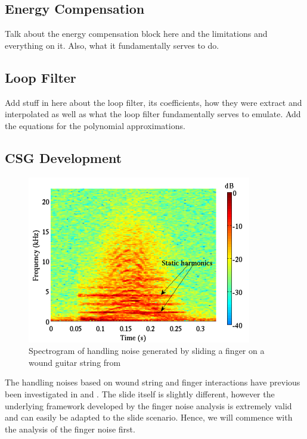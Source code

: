 \documentclass[main.tex]{subfiles}
\begin{document}
\subsection{Energy Compensation}

Talk about the energy compensation block here and the limitations and everything on it. Also, what it fundamentally serves to do.

\subsection{Loop Filter}
Add stuff in here about the loop filter, its coefficients, how they were extract and interpolated as well as what the loop filter fundamentally serves to emulate. Add the equations for the polynomial approximations.

\subsection{CSG Development}

\begin{figure}[h]
    \centering
    \includegraphics[scale=1]{./images/pictures/finger-noise-spectrogram.png}
    \caption{Spectrogram of handling noise generated by sliding a finger on a wound guitar string from }
    \label{fig:finger_noise_spectrogram}
\end{figure}


The handling noises based on wound string and finger interactions have previous been investigated in  and . The slide itself is slightly different, however the underlying framework developed by the finger noise analysis is extremely valid and can easily be adapted to the slide scenario. Hence, we will commence with the analysis of the finger noise first.
\end{document}
